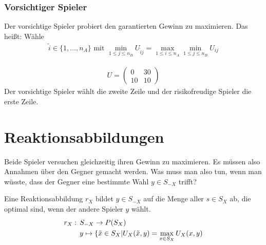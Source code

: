 \subsubsection{Vorsichtiger Spieler}
Der vorsichtige Spieler probiert den garantierten Gewinn zu maximieren. Das heißt: Wähle 
\begin{align*}
	\tilde{i} \in \{1, \dots, n_A  \} \text{ mit } \min\limits_{1 \leq j \leq n_B} U_{\tilde{i}j}=\max\limits_{1 \leq i \leq n_A} \min\limits_{1 \leq j \leq n_B} U_{ij}
\end{align*} 

\begin{bsp}[Regenschirm?]
	\begin{align*} U=
		\begin{pmatrix}
			0 & 30 \\ 10 & 10
		\end{pmatrix}
	\end{align*}
	Der vorsichtige Spieler wählt die zweite Zeile und der risikofreudige Spieler die erste Zeile. 
\end{bsp}

\section{Reaktionsabbildungen}
Beide Spieler versuchen gleichzeitig ihren Gewinn zu maximieren. Es müssen also Annahmen über den Gegner gemacht werden. Was muss man also tun, wenn man wüsste, dass der Gegner eine bestimmte Wahl $y \in S_{-X}$ trifft? 

\begin{defi}[Reaktionsabbildung]
	Eine Reaktionsabbildung $r_X$ bildet $y \in S_{-X}$  auf die Menge aller $s \in S_X$ ab, die optimal sind, wenn der andere Spieler $y$ wählt.
	\begin{align*}
		 r_X:\hspace{1ex}&  S_{-X} \rightarrow P(S_X) \\
		& y \mapsto \{\tilde{x} \in S_X | U_X(\tilde{x},y)=\max\limits_{x \in S_X} U_X(x,y)
	\end{align*}
\end{defi}

